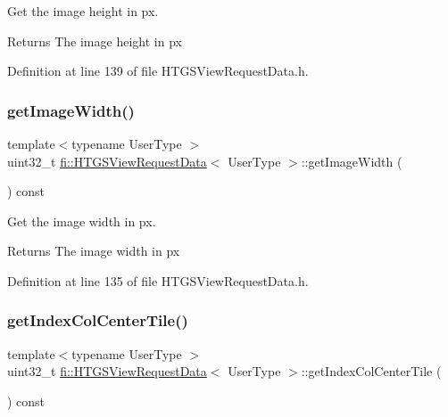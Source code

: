 Get the image height in px. 

\begin{DoxyReturn}{Returns}
The image height in px 
\end{DoxyReturn}


Definition at line 139 of file H\+T\+G\+S\+View\+Request\+Data.\+h.

\mbox{\label{classfi_1_1HTGSViewRequestData_a32e423ae766882572c8a97ff0586cf2d}} 
\subsubsection{\texorpdfstring{get\+Image\+Width()}{getImageWidth()}}
{\footnotesize\ttfamily template$<$typename User\+Type $>$ \\
uint32\+\_\+t \hyperlink{classfi_1_1HTGSViewRequestData}{fi\+::\+H\+T\+G\+S\+View\+Request\+Data}$<$ User\+Type $>$\+::get\+Image\+Width (\begin{DoxyParamCaption}{ }\end{DoxyParamCaption}) const\hspace{0.3cm}{\ttfamily [inline]}}



Get the image width in px. 

\begin{DoxyReturn}{Returns}
The image width in px 
\end{DoxyReturn}


Definition at line 135 of file H\+T\+G\+S\+View\+Request\+Data.\+h.

\mbox{\label{classfi_1_1HTGSViewRequestData_a123411ba1e7aa49a934a8191409b8d81}} 
\subsubsection{\texorpdfstring{get\+Index\+Col\+Center\+Tile()}{getIndexColCenterTile()}}
{\footnotesize\ttfamily template$<$typename User\+Type $>$ \\
uint32\+\_\+t \hyperlink{classfi_1_1HTGSViewRequestData}{fi\+::\+H\+T\+G\+S\+View\+Request\+Data}$<$ User\+Type $>$\+::get\+Index\+Col\+Center\+Tile (\begin{DoxyParamCaption}{ }\end{DoxyParamCaption}) const\hspace{0.3cm}{\ttfamily [inline]}}



